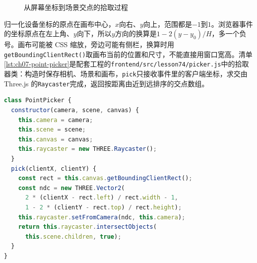 \begin{figure}[htbp]
\centering
{}
\caption{从屏幕坐标到场景交点的拾取过程}
\label{fig:ray-picking}
\end{figure}

归一化设备坐标的原点在画布中心，$x$向右、$y$向上，范围都是$-1$到$1$。浏览器事件的坐标原点在左上角、$y$向下，所以$y$方向的换算是$1-2(y-y_0)/H$，多一个负号。画布可能被 CSS 缩放，旁边可能有侧栏，换算时用\texttt{getBoundingClientRect()}取画布当前的位置和尺寸，不能直接用窗口宽高。清单\ref{lst:ch07-point-picker}是配套工程的\texttt{frontend/src/lesson74/picker.js}中的拾取器类：构造时保存相机、场景和画布，\texttt{pick}只接收事件里的客户端坐标，求交由 Three.js 的\texttt{Raycaster}完成，返回按距离由近到远排序的交点数组。

\begin{lstlisting}[label={lst:ch07-point-picker},language=JavaScript,caption={PointPicker：射线拾取器}]
class PointPicker {
  constructor(camera, scene, canvas) {
    this.camera = camera;
    this.scene = scene;
    this.canvas = canvas;
    this.raycaster = new THREE.Raycaster();
  }
  pick(clientX, clientY) {
    const rect = this.canvas.getBoundingClientRect();
    const ndc = new THREE.Vector2(
      2 * (clientX - rect.left) / rect.width - 1,
      1 - 2 * (clientY - rect.top) / rect.height);
    this.raycaster.setFromCamera(ndc, this.camera);
    return this.raycaster.intersectObjects(
      this.scene.children, true);
  }
}
\end{lstlisting}

